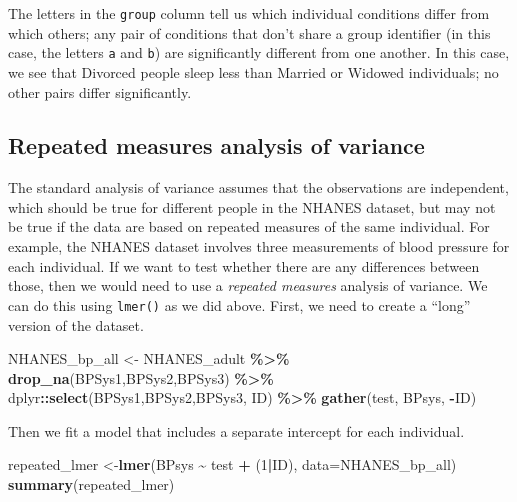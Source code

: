 \documentclass[
  12pt,
]{book}
\newenvironment{Shaded}{\begin{snugshade}}{\end{snugshade}}
\newcommand{\AttributeTok}[1]{\textcolor[rgb]{0.13,0.29,0.53}{#1}}
\newcommand{\DecValTok}[1]{\textcolor[rgb]{0.00,0.00,0.81}{#1}}
\newcommand{\FunctionTok}[1]{\textcolor[rgb]{0.13,0.29,0.53}{\textbf{#1}}}
\newcommand{\NormalTok}[1]{#1}
\newcommand{\OtherTok}[1]{\textcolor[rgb]{0.56,0.35,0.01}{#1}}
\newcommand{\SpecialCharTok}[1]{\textcolor[rgb]{0.81,0.36,0.00}{\textbf{#1}}}
\begin{document}
The letters in the \texttt{group} column tell us which individual conditions differ from which others; any pair of conditions that don't share a group identifier (in this case, the letters \texttt{a} and \texttt{b}) are significantly different from one another. In this case, we see that Divorced people sleep less than Married or Widowed individuals; no other pairs differ significantly.

\hypertarget{repeated-measures-analysis-of-variance}{%
\subsection{Repeated measures analysis of variance}\label{repeated-measures-analysis-of-variance}}

The standard analysis of variance assumes that the observations are independent, which should be true for different people in the NHANES dataset, but may not be true if the data are based on repeated measures of the same individual. For example, the NHANES dataset involves three measurements of blood pressure for each individual. If we want to test whether there are any differences between those, then we would need to use a \emph{repeated measures} analysis of variance. We can do this using \texttt{lmer()} as we did above. First, we need to create a ``long'' version of the dataset.

\begin{Shaded}
\begin{Highlighting}[]
\NormalTok{NHANES\_bp\_all }\OtherTok{\textless{}{-}}\NormalTok{ NHANES\_adult }\SpecialCharTok{\%\textgreater{}\%}
  \FunctionTok{drop\_na}\NormalTok{(BPSys1,BPSys2,BPSys3) }\SpecialCharTok{\%\textgreater{}\%}
\NormalTok{  dplyr}\SpecialCharTok{::}\FunctionTok{select}\NormalTok{(BPSys1,BPSys2,BPSys3, ID) }\SpecialCharTok{\%\textgreater{}\%}
  \FunctionTok{gather}\NormalTok{(test, BPsys, }\SpecialCharTok{{-}}\NormalTok{ID)}
\end{Highlighting}
\end{Shaded}

Then we fit a model that includes a separate intercept for each individual.

\begin{Shaded}
\begin{Highlighting}[]
\NormalTok{repeated\_lmer }\OtherTok{\textless{}{-}}\FunctionTok{lmer}\NormalTok{(BPsys }\SpecialCharTok{\textasciitilde{}}\NormalTok{ test }\SpecialCharTok{+}\NormalTok{ (}\DecValTok{1}\SpecialCharTok{|}\NormalTok{ID), }\AttributeTok{data=}\NormalTok{NHANES\_bp\_all)}
\FunctionTok{summary}\NormalTok{(repeated\_lmer)}
\end{Highlighting}
\end{Shaded}
\end{document}
